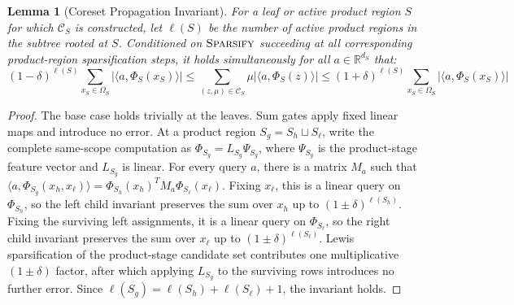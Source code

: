 \documentclass{article}
\newtheorem{lemma}{Lemma}[section]
\begin{document}
\begin{lemma}[Coreset Propagation Invariant]
\label{lem:pc_invariant}
For a leaf or active product region $S$ for which $\mathcal C_S$ is constructed, let $\ell(S)$ be the number of active product regions in the subtree rooted at $S$. Conditioned on $\textsc{Sparsify}$ succeeding at all corresponding product-region sparsification steps, it holds simultaneously for all $a \in \mathbb{R}^{d_S}$ that:
\begin{equation*}
    (1 - \delta)^{\ell(S)} \sum_{x_S \in \Omega_S} |\langle a, \Phi_S(x_S) \rangle| \le \sum_{(z,\mu) \in \mathcal{C}_S} \mu |\langle a, \Phi_S(z) \rangle| \le (1 + \delta)^{\ell(S)} \sum_{x_S \in \Omega_S} |\langle a, \Phi_S(x_S) \rangle|
\end{equation*}
\end{lemma}
\begin{proof}
The base case holds trivially at the leaves. Sum gates apply fixed linear maps and introduce no error. At a product region $S_g = S_h \sqcup S_\ell$, write the complete same-scope computation as $\Phi_{S_g}=L_{S_g}\Psi_{S_g}$, where $\Psi_{S_g}$ is the product-stage feature vector and $L_{S_g}$ is linear. For every query $a$, there is a matrix $M_a$ such that $\langle a,\Phi_{S_g}(x_h,x_\ell)\rangle=\Phi_{S_h}(x_h)^T M_a\Phi_{S_\ell}(x_\ell)$. Fixing $x_\ell$, this is a linear query on $\Phi_{S_h}$, so the left child invariant preserves the sum over $x_h$ up to $(1 \pm \delta)^{\ell(S_h)}$. Fixing the surviving left assignments, it is a linear query on $\Phi_{S_\ell}$, so the right child invariant preserves the sum over $x_\ell$ up to $(1 \pm \delta)^{\ell(S_\ell)}$. Lewis sparsification of the product-stage candidate set contributes one multiplicative $(1 \pm \delta)$ factor, after which applying $L_{S_g}$ to the surviving rows introduces no further error. Since $\ell(S_g) = \ell(S_h) + \ell(S_\ell) + 1$, the invariant holds.
\end{proof}
\end{document}
